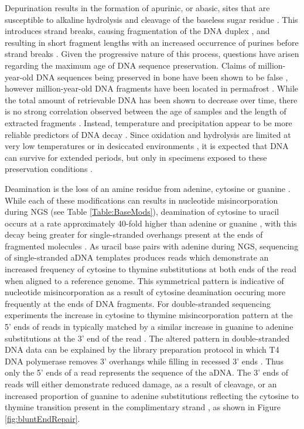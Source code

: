 \documentclass[12pt, a4paper]{article}
\begin{document}
Depurination results in the formation of apurinic, or abasic, sites that are susceptible to alkaline hydrolysis and cleavage of the baseless sugar residue \cite{Lindahl:1972aa,Lindahl:1993aa}. 
This introduces strand breaks, causing fragmentation of the DNA duplex \cite{Garcia-Garcera:2011aa}, and resulting in short fragment lengths with an increased occurrence of purines before strand breaks \cite{Briggs:2007aa}. 
Given the progressive nature of this process, questions have arisen regarding the maximum age of DNA sequence preservation. 
Claims of million-year-old DNA sequences being preserved in bone have been shown to be false \cite{Allentoft:2012aa}, however million-year-old DNA fragments have been located in permafrost \cite{Poinar:2006aa}. 
While the total amount of retrievable DNA has been shown to decrease over time, there is no strong correlation observed between the age of samples and the length of extracted fragments \cite{Sawyer:2012aa}. 
Instead, temperature and precipitation appear to be more reliable predictors of DNA decay \cite{Kistler:2017}. 
Since oxidation and hydrolysis are limited at very low temperatures or in desiccated environments \cite{Dabney:2013aa}, it is expected that DNA can survive for extended periods, but only in specimens exposed to these preservation conditions \cite{Allentoft:2012aa}.

Deamination is the loss of an amine residue from adenine, cytosine or guanine \cite{Lindahl:1993aa}. 
While each of these modifications can results in nucleotide misincorporation during NGS (see Table \ref{Table:BaseMods}), deamination of cytosine to uracil occurs at a rate approximately 40-fold higher than adenine or guanine \cite{Stiller:2006aa}, with this decay being greater for single-stranded overhangs present at the ends of fragmented molecules \cite{Lindahl:1993aa}.
As uracil base pairs with adenine during NGS, sequencing of single-stranded aDNA templates produces reads which demonstrate an increased frequency of cytosine to thymine substitutions  at both ends of the read when aligned to a reference genome. 
This symmetrical pattern is indicative of nucleotide misincorporation as a result of cytosine deamination occuring more frequently at the ends of DNA fragments. 
For double-stranded sequencing experiments the increase in cytosine to thymine misincorporation pattern at the 5' ends of reads in typically matched by a similar increase in guanine to adenine substitutions at the 3' end of the read \cite{Briggs:2007aa}.
The altered pattern in double-stranded DNA data can be explained by the library preparation protocol \cite{Briggs:2007aa, Sawyer:2012aa} in which T4 DNA polymerase removes 3' overhangs while filling in recessed 3' ends . 
Thus only the 5' ends of a read represents the sequence of the aDNA. 
The 3' ends of reads will either demonstrate reduced damage, as a result of cleavage, or an increased proportion of guanine to adenine substitutions reflecting the cytosine to thymine transition present in the complimentary strand \cite{Briggs:2007aa,Sawyer:2012aa}, as shown in Figure \ref{fig:bluntEndRepair}.\\
\end{document}
